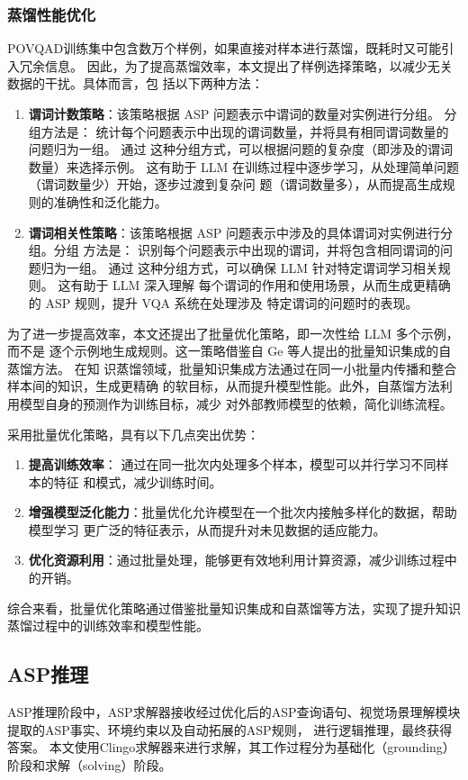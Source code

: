 \subsubsection{蒸馏性能优化}
POVQAD训练集中包含数万个样例，如果直接对样本进行蒸馏，既耗时又可能引入冗余信息。
因此，为了提高蒸馏效率，本文提出了样例选择策略，以减少无关数据的干扰。具体而言，包
括以下两种方法：
\begin{enumerate}[nosep]
\item \textbf{谓词计数策略}：该策略根据 ASP 问题表示中谓词的数量对实例进行分组。 分组方法是：
统计每个问题表示中出现的谓词数量，并将具有相同谓词数量的问题归为一组。 通过
这种分组方式，可以根据问题的复杂度（即涉及的谓词数量）来选择示例。 这有助于
LLM 在训练过程中逐步学习，从处理简单问题（谓词数量少）开始，逐步过渡到复杂问
题（谓词数量多），从而提高生成规则的准确性和泛化能力。
\item \textbf{谓词相关性策略}：该策略根据 ASP 问题表示中涉及的具体谓词对实例进行分组。分组
方法是： 识别每个问题表示中出现的谓词，并将包含相同谓词的问题归为一组。 通过
这种分组方式，可以确保 LLM 针对特定谓词学习相关规则。 这有助于 LLM 深入理解
每个谓词的作用和使用场景，从而生成更精确的 ASP 规则，提升 VQA 系统在处理涉及
特定谓词的问题时的表现。
\end{enumerate}

为了进一步提高效率，本文还提出了批量优化策略，即一次性给 LLM 多个示例，而不是
逐个示例地生成规则。这一策略借鉴自 Ge\cite{ge2021selfdistillationbatchknowledgeensembling} 等人提出的批量知识集成的自蒸馏方法。 在知
识蒸馏领域，批量知识集成方法通过在同一小批量内传播和整合样本间的知识，生成更精确
的软目标，从而提升模型性能。此外，自蒸馏方法利用模型自身的预测作为训练目标，减少
对外部教师模型的依赖，简化训练流程。

采用批量优化策略，具有以下几点突出优势：
\begin{enumerate}[nosep]
\item \textbf{提高训练效率}： 通过在同一批次内处理多个样本，模型可以并行学习不同样本的特征
和模式，减少训练时间。
\item \textbf{增强模型泛化能力}：批量优化允许模型在一个批次内接触多样化的数据，帮助模型学习
更广泛的特征表示，从而提升对未见数据的适应能力。
\item \textbf{优化资源利用}：通过批量处理，能够更有效地利用计算资源，减少训练过程中的开销。
\end{enumerate}

综合来看，批量优化策略通过借鉴批量知识集成和自蒸馏等方法，实现了提升知识蒸馏过程中的训练效率和模型性能。
\subsection{ASP推理}
ASP推理阶段中，ASP求解器接收经过优化后的ASP查询语句、视觉场景理解模块提取的ASP事实、环境约束以及自动拓展的ASP规则，
进行逻辑推理，最终获得答案。
本文使用Clingo求解器来进行求解，其工作过程分为基础化（grounding）阶段和求解（solving）阶段。

